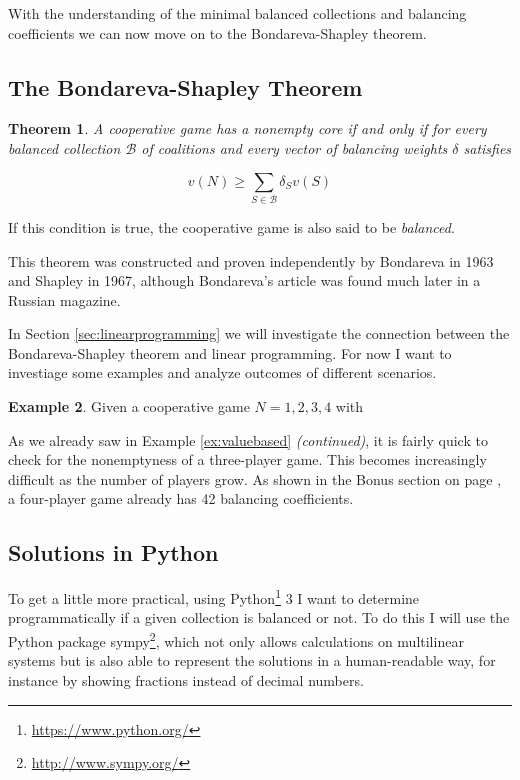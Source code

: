 \documentclass[10pt,a4paper,titlepage]{article}
\theoremstyle{plain}
\newtheorem{thm}{Theorem}[section] %
\theoremstyle{definition}
\newtheorem{example}[thm]{Example} %
\begin{document}
With the understanding of the minimal balanced collections and balancing coefficients we can now move on to the Bondareva-Shapley theorem.


\subsection{The Bondareva-Shapley Theorem}\label{sec:bondareva}

\begin{thm}
    A cooperative game has a nonempty core if and only if for every balanced collection $\mathcal{B}$ of coalitions and every vector of balancing weights $\delta$ satisfies

    \begin{equation}
        v(N) \geq \sum_{S \in \mathcal{B}} \delta_S v(S)
    \end{equation}
\end{thm}

If this condition is true, the cooperative game is also said to be \textit{balanced}.

This theorem was constructed and proven independently by Bondareva\cite{bondareva} in 1963 and Shapley\cite{shapley} in 1967, although Bondareva's article was found much later in a Russian magazine.

In Section \ref{sec:linearprogramming} we will investigate the connection between the Bondareva-Shapley theorem and linear programming. For now I want to investiage some examples and analyze outcomes of different scenarios.

\begin{example}
    Given a cooperative game $N = {1, 2, 3, 4}$ with 
\end{example}

As we already saw in Example \ref{ex:valuebased} \textit{(continued)}, it is fairly quick to check for the nonemptyness of a three-player game. This becomes increasingly difficult as the number of players grow. As shown in the Bonus section on page \pageref{bonus}, a four-player game already has 42 balancing coefficients.




\subsection{Solutions in Python}

To get a little more practical, using Python\footnote{\url{https://www.python.org/}} 3 I want to determine programmatically if a given collection is balanced or not. To do this I will use the Python package sympy\footnote{\url{http://www.sympy.org/}}, which not only allows calculations on multilinear systems but is also able to represent the solutions in a human-readable way, for instance by showing fractions instead of decimal numbers.
\end{document}
